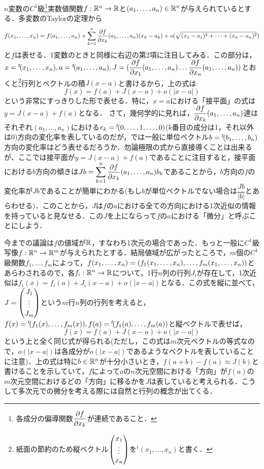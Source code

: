 $n$変数の$C^1$級\footnote{各成分の偏導関数$\displaystyle\frac{\partial f}{\partial x_k}$が連続であること．}実数値関数$f:{\mathbb R}^n\rightarrow{\mathbb R}$と$(a_1,\dots,a_n)\in{\mathbb R}^n$が与えられているとする．多変数のTaylorの定理から
$$
f(x_1,\dots,x_n)=f(a_1,\dots,a_n)+\sum_{k=1}^{n}\displaystyle\frac{\partial f}{\partial x_k}(a_1,\dots,a_n)(x_k-a_k)+o(\sqrt{(x_1-a_1)^2+\cdots+(x_n-a_n)^2})
$$
と$f$は表せる．1変数のときと同様に右辺の第2項に注目してみる．この部分は，$x={}^t\!(x_1,\dots,x_n), a={}^t\!(a_1,\dots,a_n), J=(\displaystyle\frac{\partial f}{\partial x_1}(a_1,\dots,a_n) \dots \displaystyle\frac{\partial f}{\partial x_n}(a_1,\dots,a_n))$とおくと\footnote{紙面の節約のため縦ベクトル$\begin{pmatrix} x_1 \\ \vdots \\ x_n\end{pmatrix}$を${}^t\!(x_1,\dots,x_n)$と書く．}行列とベクトルの積$J(x-a)$と書けるから，上の式は
$$
f(x)=f(a)+J(x-a)+o(|x-a|)
$$
という非常にすっきりした形で表せる．特に，$x=a$における「接平面」の式は$y=J(x-a)+f(a)$となる．
さて，幾何学的に見れば，$\displaystyle\frac{\partial f}{\partial x_k}(a_1,\dots,a_n)$達はそれぞれ$(a_1,\dots,a_n)$における$e_k={}^t\!(0,\dots,1,\dots,0)$($k$番目の成分は1，それ以外は0)方向の変化率を表しているのだが，では一般に単位ベクトル$b={}^t\!(b_1,\dots,b_n)$方向の変化率はどう表せるだろうか．勿論極限の式から直接導くことは出来るが、ここでは接平面が$y=J(x-a)+f(a)$であることに注目すると，接平面における$b$方向の傾きは$Jb=\displaystyle\sum_{k=1}^{n}\displaystyle\frac{\partial f}{\partial x_k}(a_1,\dots,a_n)b_k$であることから，$b$方向の$f$の変化率が$Jb$であることが簡単にわかる(もし$b$が単位ベクトルでない場合は$\dfrac{Jb}{|b|}$とあらわせる)．このことから，$J$は$f$の$a$における全ての方向における1次近似の情報を持っていると見なせる．この$J$を上にならって$f$の$a$における「微分」と呼ぶことにしよう．


今までの議論は$f$の値域が${\mathbb R}$，すなわち1次元の場合であった．もっと一般に$C^1$級写像$f:{\mathbb R}^n\rightarrow{\mathbb R}^m$が与えられたとする．結局値域が広がったところで，$m$個の$C^1$級関数$f_1,\dots,f_m$によって，$f(x_1,\dots,x_n)=(f_1(x_1,\dots,x_n),\dots,f_m(x_1,\dots,x_n))$とあらわされるので，各$f_i:{\mathbb R}^n\rightarrow{\mathbb R}$について，1行$n$列の行列$J_i$が存在して，1次近似は$f_i(x)=f_i(a)+J_i(x-a)+o(|x-a|)$となる．この式を縦に並べて，$J=\begin{pmatrix} J_1\\ \vdots \\J_m\end{pmatrix}$という$m$行$n$列の行列を考えると，$f(x)={}^t\!(f_1(x),\dots,f_m(x)),f(a)={}^t\!(f_1(a),\dots,f_m(a))$と縦ベクトルで表せば，
$$
f(x)=f(a)+J(x-a)+o(|x-a|)
$$
という上と全く同じ式が得られる(ただし，この式は$m$次元ベクトルの等式なので，$o(|x-a|)$は各成分が$o(|x-a|)$であるようなベクトルを表していることに注意)．上の式は特に$b\in{\mathbb R}^n$が十分小さいとき，$f(a+b)-f(a)\approx J(b)$と書けることを示していて，$f$によって$a$の$n$次元空間における「方向」が$f(a)$の$m$次元空間におけるどの「方向」に移るかを$J$は表していると考えられる．こうして多次元での微分を考える際には自然と行列の概念が出てくる．


